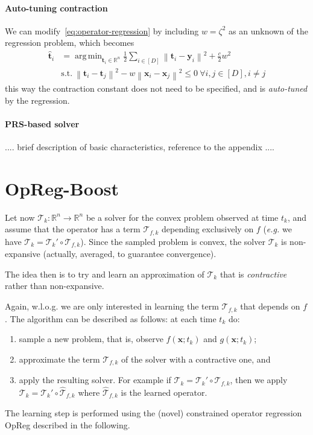 \documentclass{article}
\DeclareMathOperator*{\argmin}{arg\,min}
\newcommand{\norm}[1]{\left\lVert#1\right\rVert}
\newcommand{\R}{\mathbb{R}}
\newcommand{\tv}{\mathbold{t}}
\newcommand{\x}{\mathbold{x}}
\newcommand{\y}{\mathbold{y}}
\newcommand{\T}{\mathcal{T}}
\begin{document}
\paragraph{Auto-tuning contraction}
We can modify~\eqref{eq:operator-regression} by including $w = \zeta^2$ as an unknown of the regression problem, which becomes
\begin{equation}
\begin{split}
	\hat{\tv}_i &= \argmin_{\tv_i \in \R^n} \frac{1}{2} \sum_{i \in [D]} \norm{\tv_i - \y_i}^2 + \frac{c}{2} w^2 \\
	&\text{s.t.} \ \norm{\tv_i - \tv_j}^2 - w \norm{\x_i - \x_j}^2 \leq 0 \ \forall i,j \in [D], i \neq j
\end{split}
\end{equation}
this way the contraction constant does not need to be specified, and is \emph{auto-tuned} by the regression.


\paragraph{PRS-based solver}
.... brief description of basic characteristics, reference to the appendix ....


\section{OpReg-Boost}\label{sec:online-opreg}

Let now $\T_k : \R^n \to \R^n$ be a solver for the convex problem observed at time $t_k$, and assume that the operator has a term $\T_{f,k}$ depending exclusively on $f$ (\emph{e.g.} we have $\T_k = \T_k' \circ \T_{f,k}$). Since the sampled problem is convex, the solver $\T_k$ is non-expansive (actually, averaged, to guarantee convergence).

The idea then is to try and learn an approximation of $\T_k$ that is \emph{contractive} rather than non-expansive.

Again, w.l.o.g. we are only interested in learning the term $\T_{f,k}$ that depends on $f$. The algorithm can be described as follows: at each time $t_k$ do:
\begin{enumerate}
	\item sample a new problem, that is, observe $f(\x; t_k)$ and $g(\x; t_k)$;

	\item approximate the term $\T_{f,k}$ of the solver with a contractive one, and
	
	\item apply the resulting solver. For example if $\T_k = \T_k' \circ \T_{f,k}$, then we apply $\T_k = \T_k' \circ \hat{\T}_{f,k}$ where $\hat{\T}_{f,k}$ is the learned operator.
\end{enumerate}
The learning step is performed using the (novel) constrained operator regression OpReg described in the following.
\end{document}
